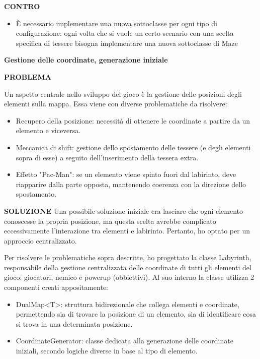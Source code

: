 \documentclass[a4paper,12pt]{report}
\begin{document}
\textbf{CONTRO}
\begin{itemize}
	\item È necessario implementare una nuova sottoclasse per ogni tipo di configurazione: ogni volta che si vuole un certo scenario con una scelta specifica di tessere bisogna 
	implementare una nuova sottoclasse di Maze
\end{itemize}

\textbf{Gestione delle coordinate, generazione iniziale}

\textbf{PROBLEMA}

Un aspetto centrale nello sviluppo del gioco è la gestione delle posizioni degli elementi sulla mappa.
Essa viene con diverse problematiche da risolvere:
\begin{itemize}
	\item Recupero della posizione: necessità di ottenere le coordinate a partire da un elemento e viceversa.
	\item Meccanica di shift: gestione dello spostamento delle tessere (e degli elementi sopra di esse) a seguito dell’inserimento della tessera extra.
	\item Effetto "Pac-Man": se un elemento viene spinto fuori dal labirinto, deve riapparire dalla parte opposta, mantenendo coerenza con la direzione dello spostamento.
\end{itemize}

\textbf{SOLUZIONE}
Una possibile soluzione iniziale era lasciare che ogni elemento conoscesse 
la propria posizione, ma questa scelta avrebbe complicato eccessivamente 
l’interazione tra elementi e labirinto. Pertanto, ho optato per un approccio centralizzato.

Per risolvere le problematiche sopra descritte, ho progettato la classe Labyrinth, 
responsabile della gestione centralizzata delle coordinate di tutti gli elementi del gioco: giocatori, nemico e powerup (obbiettivi).
Al suo interno la classe utilizza 2 componenti creati appositamente:
\begin{itemize}
	\item DualMap<T>: struttura bidirezionale che collega elementi e coordinate, permettendo sia di trovare la posizione di un elemento, 
	sia di identificare cosa si trova in una determinata posizione.
	\item CoordinateGenerator: classe dedicata alla generazione delle coordinate iniziali, secondo logiche diverse in base al tipo di elemento.
\end{itemize}
\end{document}
